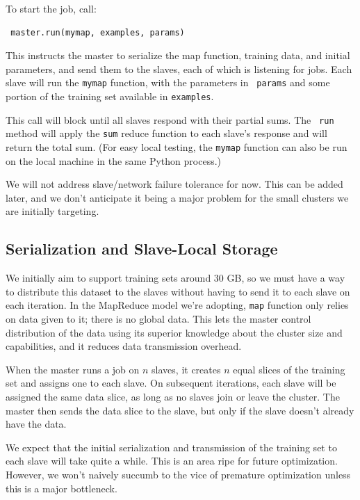 \documentclass[%
        final,
        notitlepage,
        narroweqnarray,
        inline,
        ]{ieee}
\begin{document}
To start the job, call:

\begin{verbatim}
 master.run(mymap, examples, params)
\end{verbatim}

This instructs the master to serialize the map function, training data, and
initial parameters, and send them to the slaves, each of which is listening for
jobs. Each slave will run the {\tt mymap} function, with the parameters in {\tt
  params} and some portion of the training set available in {\tt examples}.

This call will block until all slaves respond with their partial sums. The {\tt
  run} method will apply the {\tt sum} reduce function to each slave's response
and will return the total sum. (For easy local testing, the {\tt mymap}
function can also be run on the local machine in the same Python process.)

We will not address slave/network failure tolerance for now. This can be added
later, and we don't anticipate it being a major problem for the small clusters
we are initially targeting.

\subsection{Serialization and Slave-Local Storage}

We initially aim to support training sets around 30 GB, so we must have a way
to distribute this dataset to the slaves without having to send it to each slave on
each iteration. In the MapReduce model we're adopting, {\tt map} function only
relies on data given to it; there is no global data. This lets the master
control distribution of the data using its superior knowledge about the cluster
size and capabilities, and it reduces data transmission overhead.

When the master runs a job on $n$ slaves, it creates $n$ equal slices of the
training set and assigns one to each slave. On subsequent iterations, each
slave will be assigned the same data slice, as long as no slaves join or leave
the cluster. The master then sends the data slice to the slave, but only if the
slave doesn't already have the data.

We expect that the initial serialization and transmission of the training set
to each slave will take quite a while. This is an area ripe for future
optimization. However, we won't naively succumb to the vice of premature
optimization unless this is a major bottleneck.
\end{document}
